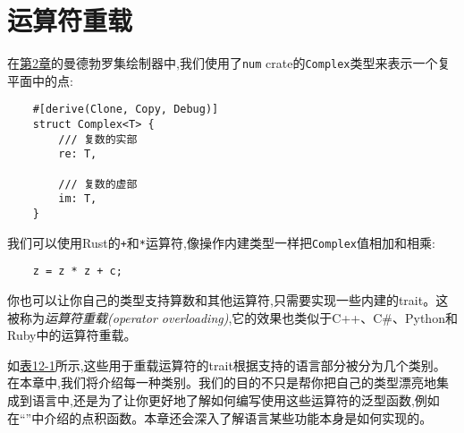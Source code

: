 \chapter{运算符重载}\label{ch12}

在\hyperref[ch02]{第2章}的曼德勃罗集绘制器中,我们使用了\texttt{num} crate的\texttt{Complex}类型来表示一个复平面中的点:
\begin{verbatim}
    #[derive(Clone, Copy, Debug)]
    struct Complex<T> {
        /// 复数的实部
        re: T,

        /// 复数的虚部
        im: T,
    }
\end{verbatim}

我们可以使用Rust的\texttt{+}和\texttt{*}运算符,像操作内建类型一样把\texttt{Complex}值相加和相乘:
\begin{verbatim}
    z = z * z + c;
\end{verbatim}

你也可以让你自己的类型支持算数和其他运算符,只需要实现一些内建的trait。这被称为\emph{运算符重载(operator overloading)},它的效果也类似于C++、C\#、Python和Ruby中的运算符重载。

如\hyperref[t12-1]{表12-1}所示,这些用于重载运算符的trait根据支持的语言部分被分为几个类别。在本章中,我们将介绍每一种类别。我们的目的不只是帮你把自己的类型漂亮地集成到语言中,还是为了让你更好地了解如何编写使用这些运算符的泛型函数,例如在“”中介绍的点积函数。本章还会深入了解语言某些功能本身是如何实现的。

